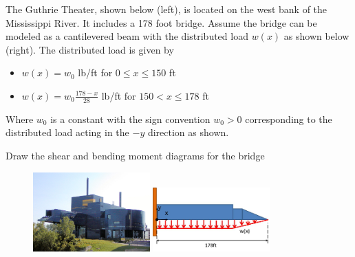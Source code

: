 
The Guthrie Theater, shown below (left), is located on the west bank of the Mississippi River. It
includes a 178 foot bridge. Assume the bridge can be modeled as a cantilevered beam with the
distributed load $w(x)$ as shown below (right). The distributed load is given by
\begin{itemize}
  \item $w(x) = w_0$ lb/ft for $0 \le x \le 150$ ft 
  \item $w(x) = w_0\frac{178-x}{28}$ lb/ft for $150 < x \le 178$ ft
\end{itemize}
Where $w_0$ is a constant with the sign convention $w_0 > 0$ corresponding to the distributed load acting in the $-y$ direction as shown.

Draw the shear and bending moment diagrams for the bridge

\begin{figure}[ht!]
  \centering
  \includegraphics[width=0.4\textwidth,
	           height=0.3\textheight,
		   keepaspectratio]{figa.png}
  \includegraphics[width=0.4\textwidth,
	           height=0.3\textheight,
		   keepaspectratio]{figb.png}
\end{figure}

